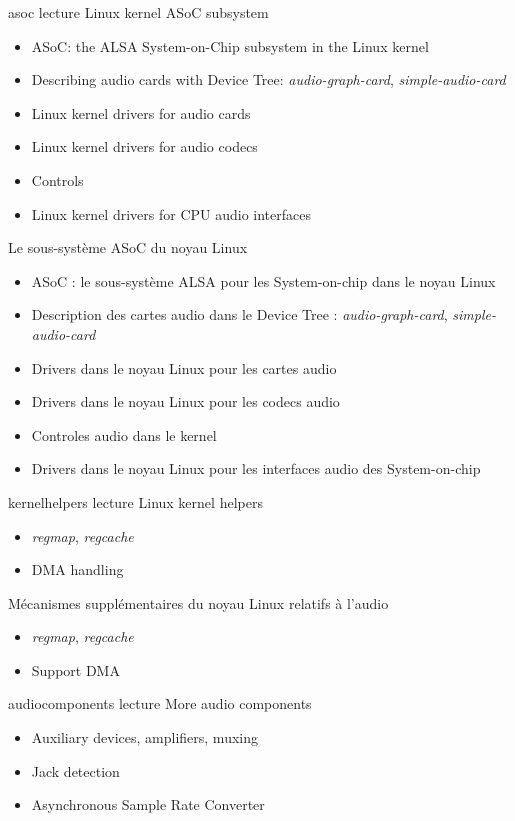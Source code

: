 {asoc}
{lecture}
{Linux kernel ASoC subsystem}
{
  \begin{itemize}
  \item ASoC: the ALSA System-on-Chip subsystem in the Linux kernel
  \item Describing audio cards with Device Tree: {\em
      audio-graph-card}, {\em simple-audio-card}
  \item Linux kernel drivers for audio cards
  \item Linux kernel drivers for audio codecs
  \item Controls
  \item Linux kernel drivers for CPU audio interfaces
  \end{itemize}
  \vspace{0.5em}
}
{Le sous-système ASoC du noyau Linux}
{
  \begin{itemize}
  \item ASoC : le sous-système ALSA pour les System-on-chip dans le noyau Linux
  \item Description des cartes audio dans le Device Tree : {\em
      audio-graph-card}, {\em simple-audio-card}
  \item Drivers dans le noyau Linux pour les cartes audio
  \item Drivers dans le noyau Linux pour les codecs audio
  \item Controles audio dans le kernel
  \item Drivers dans le noyau Linux pour les interfaces audio des
    System-on-chip
  \end{itemize}
  \vspace{0.5em}
}
{kernelhelpers}
{lecture}
{Linux kernel helpers}
{
  \begin{itemize}
  \item {\em regmap}, {\em regcache}
  \item DMA handling
  \end{itemize}
  \vspace{0.5em}
}
{Mécanismes supplémentaires du noyau Linux relatifs à l'audio}
{
  \begin{itemize}
  \item {\em regmap}, {\em regcache}
  \item Support DMA
  \end{itemize}
  \vspace{0.5em}
}
{audiocomponents}
{lecture}
{More audio components}
{
  \begin{itemize}
  \item Auxiliary devices, amplifiers, muxing
  \item Jack detection
  \item Asynchronous Sample Rate Converter
  \end{itemize}
  \vspace{0.5em}
}
